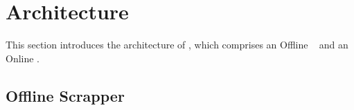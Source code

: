 

\section{Architecture}
\label{sec:arch}
This section introduces the architecture of \sys, %
which comprises an Offline \scrapper\ %
and an Online \surveyor. %


\subsection{Offline Scrapper}
\label{sec:scrapper}

